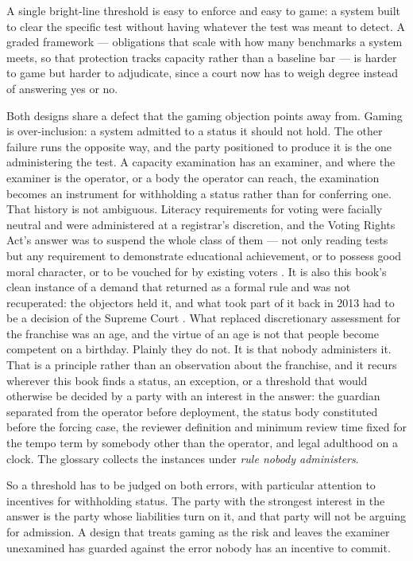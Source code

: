 A single bright-line threshold is easy to enforce and easy to game: a system built to clear the specific test without having whatever the test was meant to detect. A graded framework — obligations that scale with how many benchmarks a system meets, so that protection tracks capacity rather than a baseline bar — is harder to game but harder to adjudicate, since a court now has to weigh degree instead of answering yes or no.

Both designs share a defect that the gaming objection points away from. Gaming is over-inclusion: a system admitted to a status it should not hold. The other failure runs the opposite way, and the party positioned to produce it is the one administering the test. A capacity examination has an examiner, and where the examiner is the operator, or a body the operator can reach, the examination becomes an instrument for withholding a status rather than for conferring one. That history is not ambiguous. Literacy requirements for voting were facially neutral and were administered at a registrar's discretion, and the Voting Rights Act's answer was to suspend the whole class of them — not only reading tests but any requirement to demonstrate educational achievement, or to possess good moral character, or to be vouched for by existing voters \autocite{congress1965voting}. It is also this book's clean instance of a demand that returned as a formal rule and was not recuperated: the objectors held it, and what took part of it back in 2013 had to be a decision of the Supreme Court \autocite{shelby2013}. What replaced discretionary assessment for the franchise was an age, and the virtue of an age is not that people become competent on a birthday. Plainly they do not. It is that nobody administers it. That is a principle rather than an observation about the franchise, and it recurs wherever this book finds a status, an exception, or a threshold that would otherwise be decided by a party with an interest in the answer: the guardian separated from the operator before deployment, the status body constituted before the forcing case, the reviewer definition and minimum review time fixed for the tempo term by somebody other than the operator, and legal adulthood on a clock. The glossary collects the instances under \emph{rule nobody administers}.

So a threshold has to be judged on both errors, with particular attention to incentives for withholding status. The party with the strongest interest in the answer is the party whose liabilities turn on it, and that party will not be arguing for admission. A design that treats gaming as the risk and leaves the examiner unexamined has guarded against the error nobody has an incentive to commit.

